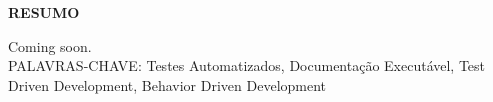 \begin{center}
\textbf{RESUMO}
\end{center}
\singlespacing

\noindent Coming soon. \\

\noindent PALAVRAS-CHAVE: Testes Automatizados, Documentação Executável, Test Driven Development, Behavior Driven Development
